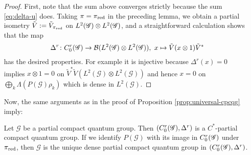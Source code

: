 \begin{proof}
  First, note that the sum above converges strictly because the sum  \eqref{eq:delta-u} does.
  Taking  $\pi=\pi_{\operatorname{\mathrm{red}}}$ in the preceding lemma, we obtain a partial isometry
$\tilde V:=\tilde{V}_{\pi_{\operatorname{\mathrm{red}}}}$ on $L^{2}(\mathscr{G}) \otimes L^{2}(\mathscr{G})$, and a straightforward calculation shows that the map
  \begin{align*}
\Delta^{r} \colon C^{r}_{0}(\mathscr{G}) \to {\cal B}(L^{2}(\mathscr{G}) \otimes L^{2}(\mathscr{G})), \ x
  \mapsto \tilde{V}(x \otimes 1)\tilde{V}^{*}   
  \end{align*}
  has the desired properties. For example it is injective because
  $\Delta^{r}(x)=0$ implies $x\otimes 1=0$ on  $\tilde{V}^{*}\tilde{V}(L^{2}(\mathscr{G})
  \otimes L^{2}(\mathscr{G}))$ and hence $x=0$ on $\bigoplus_{k} \Lambda(P(\mathscr{G})\rho_{k})$ which is dense in $L^{2}(\mathscr{G})$.
\end{proof}
Now, the same arguments as in the proof of Proposition \ref{prop:universal-cpcqg} imply:
\begin{Prop} \label{prop:reduced-cpcqg}
  Let $\mathscr{G}$ be a partial compact quantum group. Then $(C^{r}_{0}(\mathscr{G}),\Delta^{r})$  is a $C^{*}$-partial compact quantum group. If we identify $P(\mathscr{G})$ with its image in $C^{r}_{0}(\mathscr{G})$ under $\pi_{\operatorname{\mathrm{red}}}$, then $\mathscr{G}$ is the unique dense partial compact quantum group in $(C^{r}_{0}(\mathscr{G}),\Delta^{r})$.
\end{Prop}

